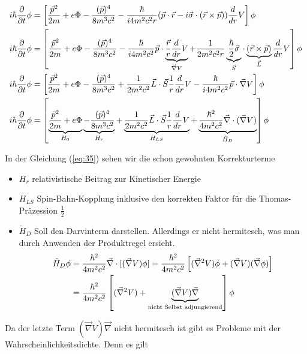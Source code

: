 \begin{align}
  \label{eq:35}
   i\hbar \pdiff_t \phi &= \left[\frac{\vec p^2}{2m}  +e\Phi - \frac{(\vec p)^4 }{8m^3c^2} -\frac{\hbar }{i4m^2c^2r}(\vec p\cdot\vec r - i\vec\sigma\cdot(\vec r\times\vec p)) \frac{d}{dr}V \right]\phi \notag\\
%
 i\hbar \pdiff_t \phi &= \left[\frac{\vec p^2}{2m}  +e\Phi - \frac{(\vec p)^4 }{8m^3c^2} -\frac{\hbar }{i4m^2c^2}\vec p\cdot\underbr{\frac{\vec r}{r}\frac{d}{dr}V}_{\vec\nabla V} + \frac{1 }{2m^2c^2r}\underbr{\frac{\hbar}{2}\vec\sigma}_{\vec S}\cdot\underbr{ (\vec r\times\vec p)}_{\vec L} \frac{d}{dr}V \right]\phi \notag\\
%
 i\hbar \pdiff_t \phi &= \left[\frac{\vec p^2}{2m}  +e\Phi - \frac{(\vec p)^4 }{8m^3c^2}+ \frac{1 }{2m^2c^2}\vec L\cdot\vec S \frac{1}{r}\frac{d}{dr}V -\frac{\hbar }{i4m^2c^2}\vec p\cdot\vec\nabla V \right]\phi \notag\\
%
 i\hbar \pdiff_t \phi &= \left[\underbr{\frac{\vec p^2}{2m}  +e\Phi}_{H_0}\underbr{ - \frac{(\vec p)^4 }{8m^3c^2}}_{H_r}+\underbr{ \frac{1 }{2m^2c^2}\vec L\cdot\vec S \frac{1}{r}\frac{d}{dr}V}_{H_{LS}} + \underbr{\frac{\hbar^2 }{4m^2c^2}\vec \nabla\cdot(\vec\nabla V)}_{\tilde H_D} \right]\phi 
\end{align}

In der Gleichung (\ref{eq:35}) sehen wir die schon gewohnten Korrekturterme

\begin{itemize}
\item \(H_r\) relativistische Beitrag zur Kinetischer Energie
\item \(H_{LS}\) Spin-Bahn-Kopplung inklusive den korrekten Faktor für die Thomas-Präzession \(\frac{1}{2}\)
\item \(\tilde H_D\) Soll den Darvinterm darstellen. Allerdings er nicht hermitesch, was man durch Anwenden der Produktregel ersieht. 
  \begin{align}
    \label{eq:36}
    \tilde H_D\phi &= \frac{\hbar^2 }{4m^2c^2}\vec \nabla\cdot[(\vec\nabla V)\phi] = \frac{\hbar^2 }{4m^2c^2}\left[(\vec \nabla^2V)\phi + (\vec\nabla V)(\vec\nabla\phi)  \right] \notag \\
&= \frac{\hbar^2 }{4m^2c^2}\left[(\vec \nabla^2V) + \underbrace{(\vec\nabla V)\vec\nabla}_{\text{nicht Selbst adjungierend}}  \right]\phi 
  \end{align}
\end{itemize}

Da der letzte Term \((\vec\nabla V)\vec\nabla\) nicht hermitesch ist gibt es Probleme mit der Wahrscheinlichkeitsdichte. Denn es gilt

